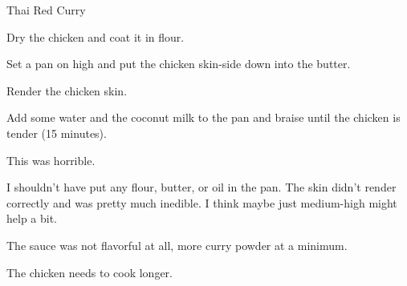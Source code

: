 \documentclass{recipe}
\begin{document}
\begin{recipe}{Thai Red Curry}

  \begin{ingredients}
    \ingredientsep
  \end{ingredients}

  \begin{steps}
  \item Dry the chicken and coat it in flour.
  \item Set a pan on high and put the chicken skin-side down into the
    butter.
  \item Render the chicken skin.
  \item Add some water and the coconut milk to the pan and braise
    until the chicken is tender (15 minutes).
  \end{steps}

  \begin{notes}
  \item This was horrible.
  \item I shouldn't have put any flour, butter, or oil in the pan.
    The skin didn't render correctly and was pretty much inedible.  I
    think maybe just medium-high might help a bit.
  \item The sauce was not flavorful at all, more curry powder at a
    minimum.
  \item The chicken needs to cook longer.
  \end{notes}
\end{recipe}
\end{document}
